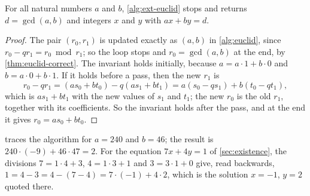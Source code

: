 \begin{proposition}
\label{prop:ext-euclid}
For all natural numbers $a$ and $b$, \cref{alg:ext-euclid} stops and returns $d=\gcd(a,b)$ and integers $x$ and $y$ with $ax+by=d$.
\end{proposition}

\begin{proof}
The pair $(r_0,r_1)$ is updated exactly as $(a,b)$ in \cref{alg:euclid}, since $r_0-qr_1=r_0\bmod r_1$; so the loop stops and $r_0=\gcd(a,b)$ at the end, by \cref{thm:euclid-correct}. The invariant holds initially, because $a=a\cdot1+b\cdot0$ and $b=a\cdot0+b\cdot1$. If it holds before a pass, then the new $r_1$ is
\[
r_0-qr_1=(as_0+bt_0)-q(as_1+bt_1)=a(s_0-qs_1)+b(t_0-qt_1),
\]
which is $as_1+bt_1$ with the new values of $s_1$ and $t_1$; the new $r_0$ is the old $r_1$, together with its coefficients. So the invariant holds after the pass, and at the end it gives $r_0=as_0+bt_0$.
\end{proof}

 traces the algorithm for $a=240$ and $b=46$; the result is $240\cdot(-9)+46\cdot47=2$. For the equation $7x+4y=1$ of \cref{sec:existence}, the divisions $7=1\cdot4+3$, $4=1\cdot3+1$ and $3=3\cdot1+0$ give, read backwards, $1=4-3=4-(7-4)=7\cdot(-1)+4\cdot2$, which is the solution $x=-1$, $y=2$ quoted there.

\begin{table}
\end{table}

